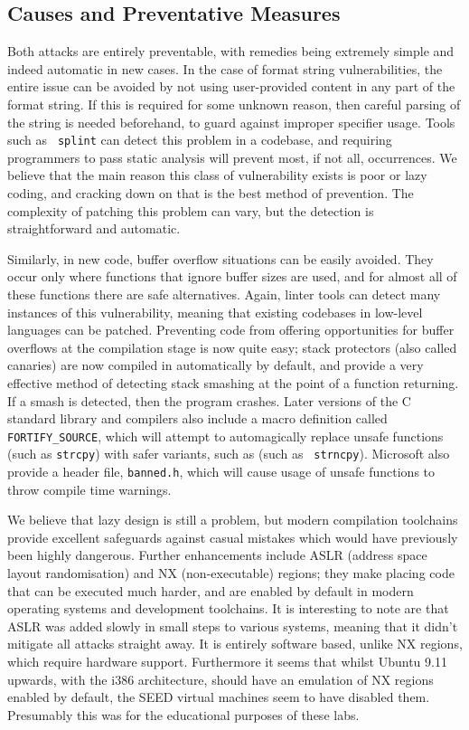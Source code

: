 \subsection{Causes and Preventative Measures} Both attacks are entirely preventable, with remedies being extremely
simple and indeed automatic in new cases. In the case of format string vulnerabilities, the entire issue can be avoided
by not using user-provided content in any part of the format string. If this is required for some unknown reason, then
careful parsing of the string  is needed beforehand, to guard against improper specifier usage. Tools such as {\tt
splint} can detect  this problem in a codebase\cite{splint_art}, and requiring programmers to pass static analysis will
prevent most, if not all, occurrences. We believe that the main reason this class of vulnerability exists is poor or lazy
coding, and cracking down on that is the best method of prevention. The complexity of patching this problem can vary,
but the detection is straightforward and automatic.

Similarly, in new code, buffer overflow situations can be easily avoided. They occur only where functions that ignore
buffer sizes are used, and for almost all of these functions there are safe alternatives. Again, linter tools can detect
many instances of this vulnerability, meaning that existing codebases in low-level languages can be patched. Preventing
code from offering opportunities for buffer overflows at the compilation stage is now quite easy; stack protectors
(also called canaries) are now compiled in automatically by default, and provide a very effective method of detecting
stack smashing at the point of a function returning. If a smash is detected, then the program crashes. Later versions of
the C standard library and compilers also include a macro definition called {\tt FORTIFY\_SOURCE}, which will attempt to
automagically replace unsafe functions (such as {\tt strcpy}) with safer variants, such as  (such as {\tt
strncpy})\cite{fort_source}. Microsoft also provide a header file, {\tt banned.h}, which will cause usage of unsafe
functions to throw compile time warnings\cite{banned}.

We believe that lazy design is still a problem, but modern compilation toolchains provide excellent safeguards against
casual mistakes which would have previously been highly dangerous. Further enhancements include ASLR (address space
layout randomisation) and NX (non-executable) regions; they make placing code that can be executed much harder, and are
enabled by default in modern operating systems and development toolchains\cite{wiki_aslr,wiki_nx}. It is
interesting to note are that ASLR was added slowly in small steps to various systems, meaning that it didn't mitigate
all attacks straight away. It is entirely software based, unlike NX regions, which require hardware support. Furthermore
it seems that whilst Ubuntu 9.11 upwards, with the i386 architecture, should have an emulation of NX regions enabled by
default\cite{nx_bit}, the SEED virtual machines seem to have disabled them.  Presumably this was for the educational
purposes of these labs.

